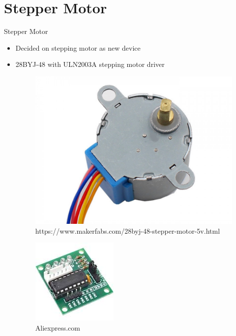\documentclass{beamer}
\begin{document}
\section{Stepper Motor}
\begin{frame}{Stepper Motor}
\begin{itemize}
\item Decided on stepping motor as new device
\item 28BYJ-48 with ULN2003A stepping motor driver
\begin{figure}
\includegraphics[scale=0.08]{figs/28byj48stepper}
\caption{https://www.makerfabs.com/28byj-48-stepper-motor-5v.html}
\end{figure}

\begin{figure}
\includegraphics[scale=0.4]{figs/uln2003astepper}
\caption{Aliexpress.com}
\end{figure}
\end{itemize}
\end{frame}
\end{document}
